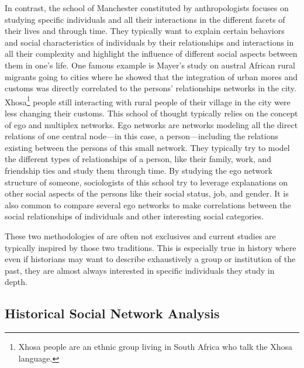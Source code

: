 In contrast, the school of Manchester constituted by anthropologists focuses on studying specific individuals and all their interactions in the different facets of their lives and through time.
They typically want to explain certain behaviors and social characteristics of individuals by their relationships and interactions in all their complexity and highlight the influence of different social aspects between them in one's life.
One famous example is Mayer's study on austral African rural migrants going to cities\cite{mayerMigrancyStudyAfricans1962} where he showed that the integration of urban mores and customs was directly correlated to the persons' relationships networks in the city.
Xhosa\footnote{Xhosa people are an ethnic group living in South Africa who talk the Xhosa language.} people still interacting with rural people of their village in the city were less changing their customs.
This school of thought typically relies on the concept of ego and multiplex networks\cite{eveDeuxTraditionsAnalyse2002}.
Ego networks are networks modeling all the direct relations of one central node---in this case, a person---including the relations existing between the persons of this small network.
They typically try to model the different types of relationships of a person, like their family, work, and friendship ties and study them through time.
By studying the ego network structure of someone, sociologists of this school try to leverage explanations on other social aspects of the persons like their social status, job, and gender.
It is also common to compare several ego networks to make correlations between the social relationships of individuals and other interesting social categories\cite{charbeyStarsHolesPaths2019}.

These two methodologies of \sna are often not exclusives and current studies are typically inspired by those two traditions.
This is especially true in history where even if historians may want to describe exhaustively a group or institution of the past, they are almost always interested in specific individuals they study in depth.


\subsection{Historical Social Network Analysis}\label{subsec:historical-social-network-analsyis}

